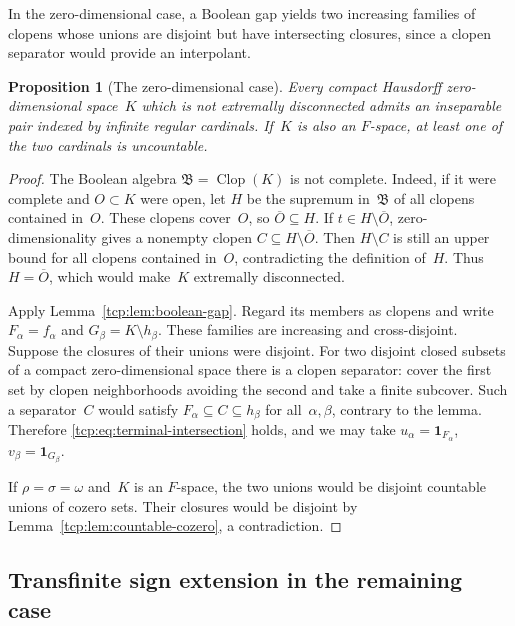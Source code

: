 \documentclass[preprint,12pt,nopreprintline]{elsarticle}
\newtheorem{proposition}[theorem]{Proposition}
\theoremstyle{definition}
\theoremstyle{remark}
\numberwithin{equation}{section}
\begin{document}
In the zero-dimensional case, a Boolean gap yields two increasing
families of clopens whose unions are disjoint but have intersecting
closures, since a clopen separator would provide an interpolant.

\begin{proposition}[The zero-dimensional case]
\label{tcp:prop:zero-dimensional}
Every compact Hausdorff zero-dimensional space~$K$ which is not extremally disconnected admits an inseparable pair indexed by
infinite regular cardinals. If~$K$ is also an $F$-space, at least one of the two cardinals is uncountable.
\end{proposition}

\begin{proof}
The Boolean algebra $\mathfrak B=\operatorname{Clop}(K)$ is not complete. Indeed, if it were complete and $O\subset K$ were open,
let $H$ be the supremum in~$\mathfrak B$ of all clopens contained in~$O$. These clopens cover~$O$, so $\overline O\subseteq H$.
If $t\in H\setminus\overline O$, zero-dimensionality gives a nonempty clopen $C\subseteq H\setminus\overline O$. Then
$H\setminus C$ is still an upper bound for all clopens contained in~$O$, contradicting the definition of~$H$. Thus $H=\overline O$, which would make~$K$ extremally disconnected.

Apply Lemma~\ref{tcp:lem:boolean-gap}. Regard its members as clopens and write $F_\alpha=f_\alpha$ and $G_\beta=K\setminus h_\beta$. These families are increasing and cross-disjoint. Suppose the closures of their unions were disjoint. For two disjoint closed subsets of a compact zero-dimensional space there is a clopen separator: cover the first set by clopen neighborhoods avoiding the second and take a finite subcover. Such a separator~$C$ would satisfy $F_\alpha\subseteq C\subseteq h_\beta$ for all~$\alpha,\beta$, contrary to the lemma. Therefore \eqref{tcp:eq:terminal-intersection} holds, and we may take $u_\alpha=\mathbf1_{F_\alpha}$, $v_\beta=\mathbf1_{G_\beta}$.

If $\rho=\sigma=\omega$ and~$K$ is an $F$-space, the two unions would be disjoint countable unions of cozero sets. Their closures would be disjoint by Lemma~\ref{tcp:lem:countable-cozero}, a contradiction.
\end{proof}


\subsection{Transfinite sign extension in the remaining case}
\end{document}
